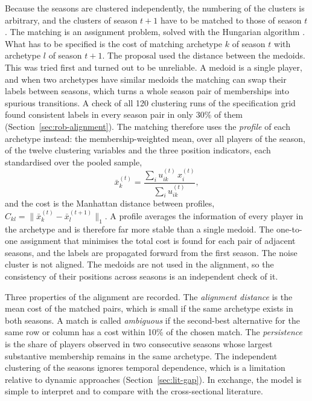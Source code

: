 Because the seasons are clustered independently, the numbering of the clusters is arbitrary, and the clusters of season $t+1$ have to be matched to those of season $t$. The matching is an assignment problem, solved with the Hungarian algorithm \cite{kuhn1955hungarian}. What has to be specified is the cost of matching archetype $k$ of season $t$ with archetype $l$ of season $t+1$. The proposal used the distance between the medoids. This was tried first and turned out to be unreliable. A medoid is a single player, and when two archetypes have similar medoids the matching can swap their labels between seasons, which turns a whole season pair of memberships into spurious transitions. A check of all 120 clustering runs of the specification grid found consistent labels in every season pair in only 30\% of them (Section~\ref{sec:rob-alignment}). The matching therefore uses the \emph{profile} of each archetype instead: the membership-weighted mean, over all players of the season, of the twelve clustering variables and the three position indicators, each standardised over the pooled sample,
\begin{equation}
	\bar x_{k}^{(t)}=\frac{\sum_i u_{ik}^{(t)}\,x_i^{(t)}}{\sum_i u_{ik}^{(t)}},
\end{equation}
and the cost is the Manhattan distance between profiles, $C_{kl}=\lVert \bar x_{k}^{(t)}-\bar x_{l}^{(t+1)}\rVert_1$. A profile averages the information of every player in the archetype and is therefore far more stable than a single medoid. The one-to-one assignment that minimises the total cost is found for each pair of adjacent seasons, and the labels are propagated forward from the first season. The noise cluster is not aligned. The medoids are not used in the alignment, so the consistency of their positions across seasons is an independent check of it.

Three properties of the alignment are recorded. The \emph{alignment distance} is the mean cost of the matched pairs, which is small if the same archetype exists in both seasons. A match is called \emph{ambiguous} if the second-best alternative for the same row or column has a cost within 10\% of the chosen match. The \emph{persistence} is the share of players observed in two consecutive seasons whose largest substantive membership remains in the same archetype. The independent clustering of the seasons ignores temporal dependence, which is a limitation relative to dynamic approaches (Section~\ref{sec:lit-gap}). In exchange, the model is simple to interpret and to compare with the cross-sectional literature.


